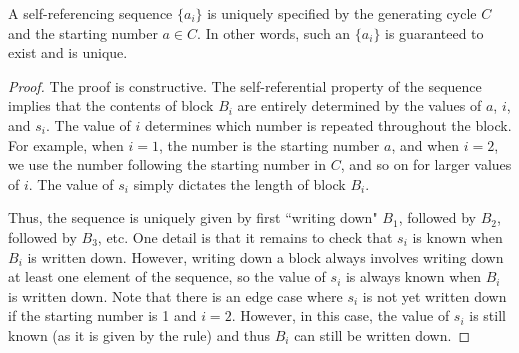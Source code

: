 \documentclass[runningheads,a4paper]{llncs}
\begin{document}
\begin{proposition}
A self-referencing sequence $\{a_i\}$ is uniquely specified by the generating cycle $C$ and the starting number $a \in C$. In other words, such an $\{a_i\}$ is guaranteed to exist and is unique.
\end{proposition}
\begin{proof} 
The proof is constructive. The self-referential property of the sequence implies that the contents of block $B_i$ are entirely determined by the values of $a$, $i$, and $s_i$. The value of $i$ determines which number is repeated throughout the block. For example, when $i = 1$, the number is the starting number $a$, and when $i = 2$, we use the number following the starting number in $C$, and so on for larger values of $i$. The value of $s_i$ simply dictates the length of block $B_i$.

Thus, the sequence is uniquely given by first ``writing down" $B_1$, followed by $B_2$, followed by $B_3$, etc. One detail is that it remains to check that $s_i$ is known when $B_i$ is written down. However, writing down a block always involves writing down at least one element of the sequence, so the value of $s_i$ is always known when $B_i$ is written down. Note that there is an edge case where $s_i$ is not yet written down if the starting number is 1 and $i =2$. However, in this case, the value of $s_i$ is still known (as it is given by the rule) and thus $B_i$ can still be written down.
\end{proof}
%
%
\end{document}
